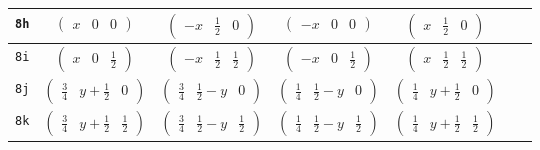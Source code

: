 \documentclass[fleqn,9pt,landscape]{jsarticle}
\begin{document}
\begin{center}
\begin{longtable}{ccccccc}
{\tt 8h} & $ \begin{pmatrix} x & 0 & 0 \end{pmatrix} $ & $ \begin{pmatrix} - x & \frac{1}{2} & 0 \end{pmatrix} $ & $ \begin{pmatrix} - x & 0 & 0 \end{pmatrix} $ & $ \begin{pmatrix} x & \frac{1}{2} & 0 \end{pmatrix} $ & $  $ & $  $ \\ \hline
{\tt 8i} & $ \begin{pmatrix} x & 0 & \frac{1}{2} \end{pmatrix} $ & $ \begin{pmatrix} - x & \frac{1}{2} & \frac{1}{2} \end{pmatrix} $ & $ \begin{pmatrix} - x & 0 & \frac{1}{2} \end{pmatrix} $ & $ \begin{pmatrix} x & \frac{1}{2} & \frac{1}{2} \end{pmatrix} $ & $  $ & $  $ \\ \hline
{\tt 8j} & $ \begin{pmatrix} \frac{3}{4} & y + \frac{1}{2} & 0 \end{pmatrix} $ & $ \begin{pmatrix} \frac{3}{4} & \frac{1}{2} - y & 0 \end{pmatrix} $ & $ \begin{pmatrix} \frac{1}{4} & \frac{1}{2} - y & 0 \end{pmatrix} $ & $ \begin{pmatrix} \frac{1}{4} & y + \frac{1}{2} & 0 \end{pmatrix} $ & $  $ & $  $ \\ \hline
{\tt 8k} & $ \begin{pmatrix} \frac{3}{4} & y + \frac{1}{2} & \frac{1}{2} \end{pmatrix} $ & $ \begin{pmatrix} \frac{3}{4} & \frac{1}{2} - y & \frac{1}{2} \end{pmatrix} $ & $ \begin{pmatrix} \frac{1}{4} & \frac{1}{2} - y & \frac{1}{2} \end{pmatrix} $ & $ \begin{pmatrix} \frac{1}{4} & y + \frac{1}{2} & \frac{1}{2} \end{pmatrix} $ & $  $ & $  $ \\ \hline

\end{longtable}
\end{center}
\end{document}

